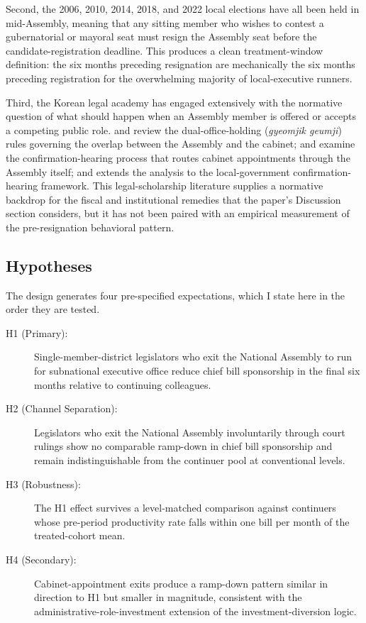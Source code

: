 \documentclass[11pt]{article}
\begin{document}
Second, the 2006, 2010, 2014, 2018, and 2022 local elections have all been held in mid-Assembly, meaning that any sitting member who wishes to contest a gubernatorial or mayoral seat must resign the Assembly seat before the candidate-registration deadline. This produces a clean treatment-window definition: the six months preceding resignation are mechanically the six months preceding registration for the overwhelming majority of local-executive runners.

Third, the Korean legal academy has engaged extensively with the normative question of what should happen when an Assembly member is offered or accepts a competing public role. \citet{leeyj2020} and \citet{oh2019} review the dual-office-holding (\textit{gyeomjik geumji}) rules governing the overlap between the Assembly and the cabinet; \citet{yoon2020} and \citet{shin2016} examine the confirmation-hearing process that routes cabinet appointments through the Assembly itself; and \citet{jeong2023} extends the analysis to the local-government confirmation-hearing framework. This legal-scholarship literature supplies a normative backdrop for the fiscal and institutional remedies that the paper's Discussion section considers, but it has not been paired with an empirical measurement of the pre-resignation behavioral pattern.

\subsection{Hypotheses}

The design generates four pre-specified expectations, which I state here in the order they are tested.

\begin{description}
\item[H1 (Primary):] Single-member-district legislators who exit the National Assembly to run for subnational executive office reduce chief bill sponsorship in the final six months relative to continuing colleagues.
\item[H2 (Channel Separation):] Legislators who exit the National Assembly involuntarily through court rulings show no comparable ramp-down in chief bill sponsorship and remain indistinguishable from the continuer pool at conventional levels.
\item[H3 (Robustness):] The H1 effect survives a level-matched comparison against continuers whose pre-period productivity rate falls within one bill per month of the treated-cohort mean.
\item[H4 (Secondary):] Cabinet-appointment exits produce a ramp-down pattern similar in direction to H1 but smaller in magnitude, consistent with the administrative-role-investment extension of the investment-diversion logic.
\end{description}
\end{document}
